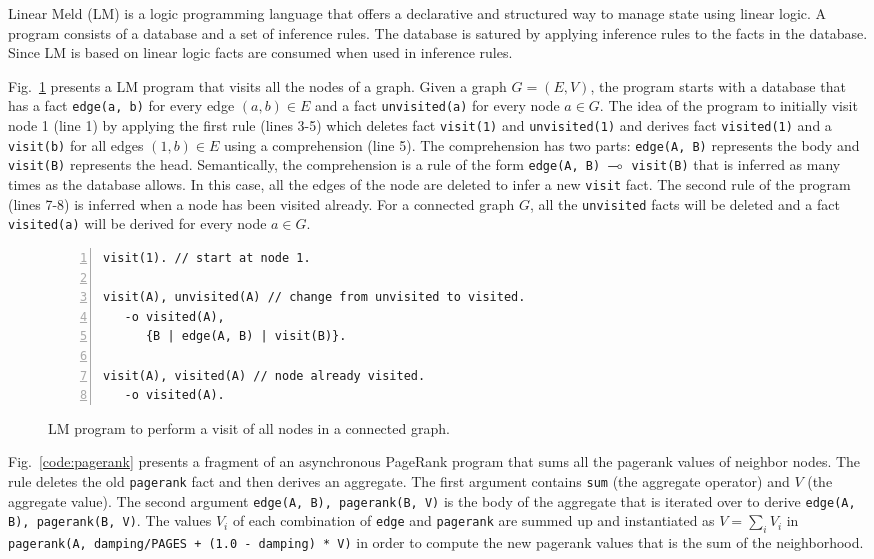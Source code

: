 Linear Meld (LM) is a logic programming language that offers a declarative and
structured way to manage state using linear logic. A program consists of a
database and a set of inference rules. The database is satured by applying
inference rules to the facts in the database. Since LM is based on linear logic
facts are consumed when used in inference rules.

Fig.~\ref{code:visit} presents a LM program that visits all the nodes of a
graph. Given a graph $G = (E, V)$, the program starts with a database that has a
fact \texttt{edge(a, b)} for every edge $(a, b) \in E$ and a fact
\texttt{unvisited(a)} for every node $a \in G$. The idea of the program to
initially visit node 1 (line 1) by applying the first rule (lines 3-5) which
deletes fact \texttt{visit(1)} and \texttt{unvisited(1)} and derives fact
\texttt{visited(1)} and a \texttt{visit(b)} for all edges $(1, b) \in E$ using a
comprehension (line 5). The comprehension has two parts: \texttt{edge(A, B)}
represents the body and \texttt{visit(B)} represents the head. Semantically, the
comprehension is a rule of the form \texttt{edge(A, B) $\multimap$ visit(B)} that
is inferred as many times as the database allows. In this case, all the edges of
the node are deleted to infer a new \texttt{visit} fact.  The second rule of the
program (lines 7-8) is inferred when a node has been visited already.  For a
connected graph $G$, all the \texttt{unvisited} facts will be deleted and a fact
\texttt{visited(a)} will be derived for every node $a \in G$.


\begin{figure}[h]
\stuffsize\begin{Verbatim}[numbers=left]
visit(1). // start at node 1.

visit(A), unvisited(A) // change from unvisited to visited.
   -o visited(A),
      {B | edge(A, B) | visit(B)}.
 
visit(A), visited(A) // node already visited.
   -o visited(A).
\end{Verbatim}
\caption{LM program to perform a visit of all nodes in a connected graph.}
  \label{code:visit}
\end{figure}

Fig.~\ref{code:pagerank} presents a fragment of an asynchronous PageRank
program that sums all the pagerank values of neighbor nodes. The rule deletes
the old \texttt{pagerank} fact and then derives an aggregate. The first
argument contains \texttt{sum} (the aggregate operator) and $V$ (the
aggregate value). The second argument \texttt{edge(A, B), pagerank(B, V)}
is the body of the aggregate that is iterated over to derive \texttt{edge(A, B),
pagerank(B, V)}. The values $V_i$ of each combination of \texttt{edge}
and \texttt{pagerank} are summed up and instantiated as $V = \sum_i V_i$ in
\texttt{pagerank(A, damping/PAGES + (1.0 - damping) * V)} in order to compute
the new pagerank values that is the sum of the neighborhood.

